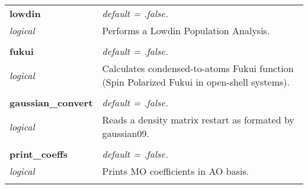 \begin{Spacing}{1.0}
\begin{longtable}{ p{} p{} }
   \textbf{lowdin}
   &  \textit{default = .false. }
   \\*\textit{logical}
   & Performs a Lowdin Population Analysis.\\* \\

   \textbf{fukui}
   &  \textit{default = .false. }
   \\*\textit{logical}
   & Calculates condensed-to-atoms Fukui function (Spin
   Polarized Fukui in open-shell systems).\\* \\

   \textbf{gaussian\_convert}
   &  \textit{default = .false. }
   \\*\textit{logical}
   & Reads a density matrix restart as formated by
   gaussian09.\\* \\

   \textbf{print\_coeffs}
   &  \textit{default = .false. }
   \\*\textit{logical}
   & Prints MO coefficients in AO basis.\\* \\

\end{longtable}
\end{Spacing}
